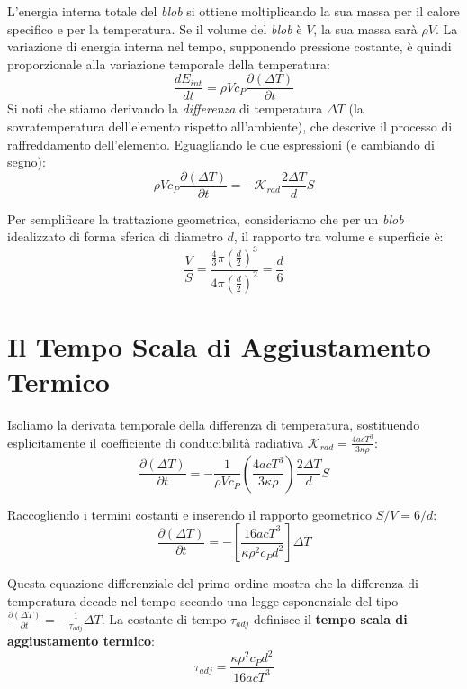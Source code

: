 L'energia interna totale del \textit{blob} si ottiene moltiplicando la sua massa per il calore specifico e per la temperatura. Se il volume del \textit{blob} è $V$, la sua massa sarà $\rho V$. La variazione di energia interna nel tempo, supponendo pressione costante, è quindi proporzionale alla variazione temporale della temperatura:
\begin{equation}
\frac{d E_{int}}{dt} = \rho V c_P \frac{\partial (\Delta T)}{\partial t}
\end{equation}
Si noti che stiamo derivando la \textit{differenza} di temperatura $\Delta T$ (la sovratemperatura dell'elemento rispetto all'ambiente), che descrive il processo di raffreddamento dell'elemento. Eguagliando le due espressioni (e cambiando di segno):
\begin{equation}
\rho V c_P \frac{\partial (\Delta T)}{\partial t} = - \mathcal{K}_{rad} \frac{2 \Delta T}{d} S
\end{equation}

Per semplificare la trattazione geometrica, consideriamo che per un \textit{blob} idealizzato di forma sferica di diametro $d$, il rapporto tra volume e superficie è:
\begin{equation}
\frac{V}{S} = \frac{\frac{4}{3}\pi \left(\frac{d}{2}\right)^3}{4\pi \left(\frac{d}{2}\right)^2} = \frac{d}{6}
\end{equation}

\section{Il Tempo Scala di Aggiustamento Termico}

Isoliamo la derivata temporale della differenza di temperatura, sostituendo esplicitamente il coefficiente di conducibilità radiativa $\mathcal{K}_{rad} = \frac{4 a c T^3}{3 \kappa \rho}$:
\begin{equation}
\frac{\partial (\Delta T)}{\partial t} = - \frac{1}{\rho V c_P} \left( \frac{4 a c T^3}{3 \kappa \rho} \right) \frac{2 \Delta T}{d} S
\end{equation}

Raccogliendo i termini costanti e inserendo il rapporto geometrico $S/V = 6/d$:
\begin{equation}
\frac{\partial (\Delta T)}{\partial t} = - \left[ \frac{16 a c T^3}{\kappa \rho^2 c_P d^2} \right] \Delta T
\end{equation}

Questa equazione differenziale del primo ordine mostra che la differenza di temperatura decade nel tempo secondo una legge esponenziale del tipo $\frac{\partial (\Delta T)}{\partial t} = - \frac{1}{\tau_{adj}} \Delta T$.
La costante di tempo $\tau_{adj}$ definisce il \textbf{tempo scala di aggiustamento termico}:
\begin{equation}
\tau_{adj} = \frac{\kappa \rho^2 c_P d^2}{16 a c T^3}
\end{equation}

